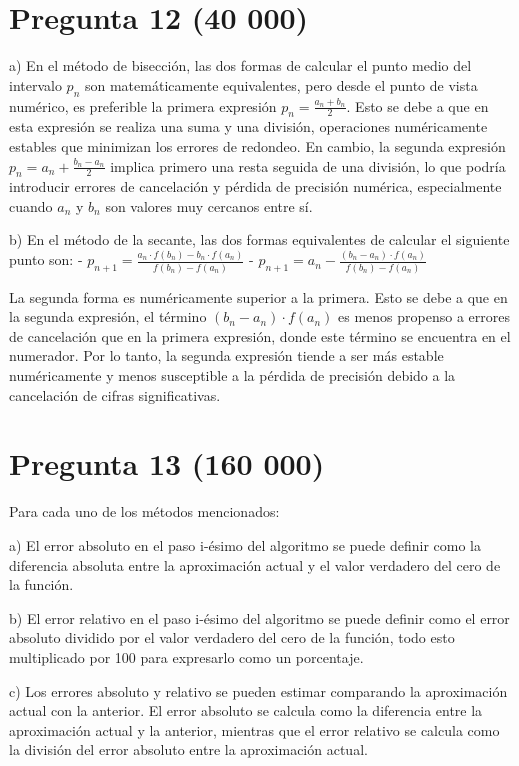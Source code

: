 \documentclass[a4paper,12pt]{article}
\begin{document}
\section*{Pregunta 12 (40 000)}
a) En el método de bisección, las dos formas de calcular el punto medio del intervalo \( p_n \) son matemáticamente equivalentes, pero desde el punto de vista numérico, es preferible la primera expresión \( p_n = \frac{a_n + b_n}{2} \). Esto se debe a que en esta expresión se realiza una suma y una división, operaciones numéricamente estables que minimizan los errores de redondeo. En cambio, la segunda expresión \( p_n = a_n + \frac{b_n - a_n}{2} \) implica primero una resta seguida de una división, lo que podría introducir errores de cancelación y pérdida de precisión numérica, especialmente cuando \( a_n \) y \( b_n \) son valores muy cercanos entre sí.

b) En el método de la secante, las dos formas equivalentes de calcular el siguiente punto son:
- \( p_{n+1} = \frac{a_n \cdot f(b_n) - b_n \cdot f(a_n)}{f(b_n) - f(a_n)} \)
- \( p_{n+1} = a_n - \frac{(b_n - a_n) \cdot f(a_n)}{f(b_n) - f(a_n)} \)

La segunda forma es numéricamente superior a la primera. Esto se debe a que en la segunda expresión, el término \( (b_n - a_n) \cdot f(a_n) \) es menos propenso a errores de cancelación que en la primera expresión, donde este término se encuentra en el numerador. Por lo tanto, la segunda expresión tiende a ser más estable numéricamente y menos susceptible a la pérdida de precisión debido a la cancelación de cifras significativas.


\section*{Pregunta 13 (160 000)}
Para cada uno de los métodos mencionados:

a) El error absoluto en el paso i-ésimo del algoritmo se puede definir como la diferencia absoluta entre la aproximación actual y el valor verdadero del cero de la función.

b) El error relativo en el paso i-ésimo del algoritmo se puede definir como el error absoluto dividido por el valor verdadero del cero de la función, todo esto multiplicado por 100 para expresarlo como un porcentaje.

c) Los errores absoluto y relativo se pueden estimar comparando la aproximación actual con la anterior. El error absoluto se calcula como la diferencia entre la aproximación actual y la anterior, mientras que el error relativo se calcula como la división del error absoluto entre la aproximación actual.
\end{document}
